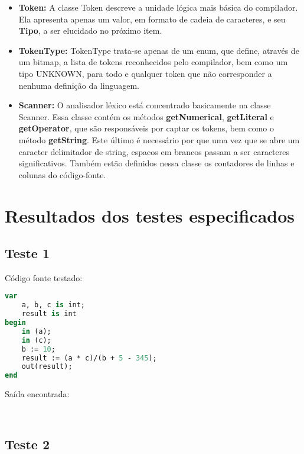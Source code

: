 \documentclass[11pt]{article}
\begin{document}
		
		\begin{itemize}
			
			\item \textbf{Token: }A classe Token descreve a unidade lógica mais básica do compilador. Ela apresenta apenas um valor, em formato de cadeia de caracteres, e seu \textbf{Tipo}, a ser elucidado no próximo item. 
			
			\item \textbf{TokenType: } TokenType trata-se apenas de um enum, que define, através de um bitmap, a lista de tokens reconhecidos pelo compilador, bem como um tipo UNKNOWN, para todo e qualquer token que não corresponder a nenhuma definição da linguagem.
			
			\item \textbf{Scanner: } O analisador léxico está concentrado basicamente na classe Scanner. Essa classe contém os métodos \textbf{getNumerical}, \textbf{getLiteral} e \textbf{getOperator}, que são responsáveis por captar os tokens, bem como o método \textbf{getString}. Este último é necessário por que uma vez que se abre um caracter delimitador de string, espacos em brancos passam a ser caracteres significativos. Também estão definidos nessa classe os contadores de linhas e colunas do código-fonte.
		
		\end{itemize}
		

\newpage
\section{Resultados dos testes especificados}




	\subsection{Teste 1}
	
	

Código fonte testado:
\begin{lstlisting}[language=Pascal]
var
	a, b, c is int;
	result is int
begin
	in (a);
	in (c);
	b := 10;
	result := (a * c)/(b + 5 - 345);
	out(result);
end
\end{lstlisting}
	
Saída encontrada:
\begin{verbatim}
	
\end{verbatim}
	
	
	
\subsection{Teste 2}
	
\end{document}

